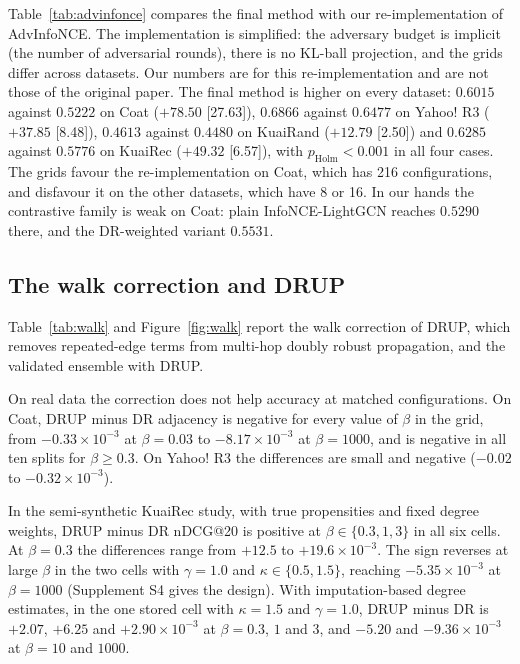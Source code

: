 Table~\ref{tab:advinfonce} compares the final method with our re-implementation of AdvInfoNCE. The
implementation is simplified: the adversary budget is implicit (the number of adversarial rounds), there is no
KL-ball projection, and the grids differ across datasets. Our numbers are for this re-implementation and are not
those of the original paper. The final method is higher on every dataset: $0.6015$ against $0.5222$ on Coat
($+78.50$ [27.63]), $0.6866$ against $0.6477$ on Yahoo! R3 ($+37.85$ [8.48]), $0.4613$ against $0.4480$ on KuaiRand
($+12.79$ [2.50]) and $0.6285$ against $0.5776$ on KuaiRec ($+49.32$ [6.57]), with $p_{\text{Holm}}<0.001$ in all four
cases. The grids favour the re-implementation on Coat, which has 216 configurations, and disfavour it on the other
datasets, which have 8 or 16. In our hands the contrastive family is weak on Coat: plain
InfoNCE-LightGCN reaches $0.5290$ there, and the DR-weighted variant $0.5531$.



\subsection{The walk correction and DRUP}\label{sec:walk}

Table~\ref{tab:walk} and Figure~\ref{fig:walk} report the walk correction of DRUP, which removes repeated-edge
terms from multi-hop doubly robust propagation, and the validated ensemble with DRUP.

On real data the correction does not help accuracy at matched configurations. On Coat, DRUP minus DR
adjacency is negative for every value of $\beta$ in the grid, from $-0.33\times10^{-3}$ at $\beta=0.03$ to
$-8.17\times10^{-3}$ at $\beta=1000$, and is negative in all ten splits for $\beta\ge0.3$. On Yahoo! R3 the
differences are small and negative ($-0.02$ to $-0.32\times10^{-3}$).

In the semi-synthetic KuaiRec study, with true propensities and fixed degree weights, DRUP minus DR nDCG@20 is
positive at $\beta\in\{0.3,1,3\}$ in all six cells. At $\beta=0.3$ the differences range from $+12.5$ to
$+19.6\times10^{-3}$. The sign reverses at large $\beta$ in the two cells with $\gamma=1.0$ and $\kappa\in\{0.5,1.5\}$,
reaching $-5.35\times10^{-3}$ at $\beta=1000$ (Supplement S4 gives the design). With imputation-based degree
estimates, in the one stored cell with $\kappa=1.5$ and $\gamma=1.0$, DRUP minus DR is $+2.07$, $+6.25$ and
$+2.90\times10^{-3}$ at $\beta=0.3$, $1$ and $3$, and $-5.20$ and $-9.36\times10^{-3}$ at $\beta=10$ and $1000$.


